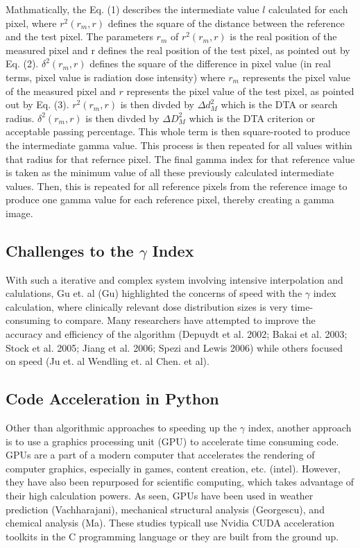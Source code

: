 \documentclass[12pt]{article}
\begin{document}
Mathmatically, the Eq. (1) describes the intermediate value $l$ calculated for each pixel, where $r^{2}(r_{m}, r)$ defines the square of the distance between the reference and the test pixel. The parameters $r_{m}$ of $r^{2}(r_{m}, r)$ is the real position of the measured pixel and r defines the real position of the test pixel, as pointed out by Eq. (2). $\delta^{2}(r_{m}, r)$ defines the square of the difference in pixel value (in real terms, pixel value is radiation dose intensity) where $r_{m}$ represents the pixel value of the measured pixel and $r$ represents the pixel value of the test pixel, as pointed out by Eq. (3). $r^{2}(r_{m}, r)$ is then divded by $\Delta d^{2}_{M}$ which is the DTA or search radius. $\delta^{2}(r_{m}, r)$ is then divded by $\Delta D^{2}_{M}$ which is the DTA criterion or acceptable passing percentage. This whole term is then square-rooted to produce the intermediate gamma value. This process is then repeated for all values within that radius for that refernce pixel. The final gamma index for that reference value is taken as the minimum value of all these previously calculated intermediate values. Then, this is repeated for all reference pixels from the reference image to produce one gamma value for each reference pixel, thereby creating a gamma image.

\subsection{Challenges to the $\gamma$ Index}
With such a iterative and complex system involving intensive interpolation and calulations, Gu et. al (Gu) highlighted the concerns of speed with the $\gamma$ index calculation, where clinically relevant dose distribution sizes is very time-consuming to compare. Many researchers have attempted to improve the accuracy and efficiency of the algorithm (Depuydt et al. 2002; Bakai et al. 2003; Stock et al. 2005; Jiang et al. 2006; Spezi and Lewis 2006) while others focused on speed (Ju et. al Wendling et. al Chen. et al).

\subsection{Code Acceleration in Python}
Other than algorithmic approaches to speeding up the $\gamma$ index, another approach is to use a graphics processing unit (GPU) to accelerate time consuming code. GPUs are a part of a modern computer that accelerates the rendering of computer graphics, especially in games, content creation, etc. (intel). However, they have also been repurposed for scientific computing, which takes advantage of their high calculation powers. As seen, GPUs have been used in weather prediction (Vachharajani), mechanical structural analysis (Georgescu), and chemical analysis (Ma). These studies typicall use Nvidia CUDA acceleration toolkits in the C programming language or they are built from the ground up.
\end{document}
